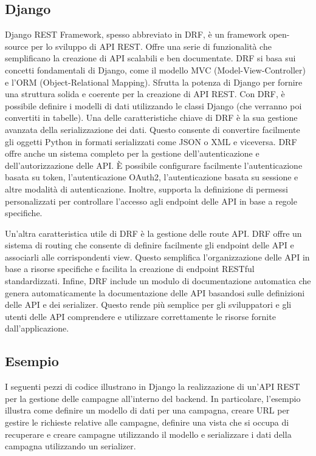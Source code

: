 \subsection{Django}
\label{subsec:Django}
Django REST Framework, spesso abbreviato in DRF, è un framework 
open-source per lo sviluppo di API REST. Offre una serie di funzionalità 
che semplificano la creazione di API scalabili e ben documentate.
DRF si basa sui concetti fondamentali di Django, come il modello 
MVC (Model-View-Controller) e l'ORM (Object-Relational Mapping). 
Sfrutta la potenza di Django per fornire una struttura solida e coerente 
per la creazione di API REST. Con DRF, è possibile definire i modelli di 
dati utilizzando le classi Django (che verranno poi convertiti in tabelle). 
Una delle caratteristiche chiave di DRF è la sua gestione avanzata della 
serializzazione dei dati. Questo consente di convertire facilmente gli 
oggetti Python in formati serializzati come JSON o XML e viceversa. 
DRF offre anche un sistema completo per la gestione dell'autenticazione 
e dell'autorizzazione delle API. È possibile configurare facilmente 
l'autenticazione basata su token, l'autenticazione OAuth2, l'autenticazione 
basata su sessione e altre modalità di autenticazione. Inoltre, supporta la 
definizione di permessi personalizzati per controllare l'accesso agli 
endpoint delle API in base a regole specifiche.

Un'altra caratteristica utile di DRF è la gestione delle route API. 
DRF offre un sistema di routing che consente di definire 
facilmente gli endpoint delle API e associarli alle corrispondenti view. 
Questo semplifica l'organizzazione delle API in base a risorse specifiche 
e facilita la creazione di endpoint RESTful standardizzati.
Infine, DRF include un modulo di documentazione automatica che genera 
automaticamente la documentazione delle API basandosi sulle definizioni 
delle API e dei serializer. Questo rende più semplice per gli sviluppatori 
e gli utenti delle API comprendere e utilizzare correttamente le risorse 
fornite dall'applicazione. ~\cite{wiki:django}\\


\subsection{Esempio}
I seguenti pezzi di codice illustrano in Django la realizzazione di 
un'API REST per la gestione delle campagne all'interno del backend.
In particolare, l'esempio illustra come definire un modello di dati per una 
campagna, creare URL per gestire le richieste relative alle campagne, definire 
una vista che si occupa di recuperare e creare campagne utilizzando il modello 
e serializzare i dati della campagna utilizzando un serializer.

